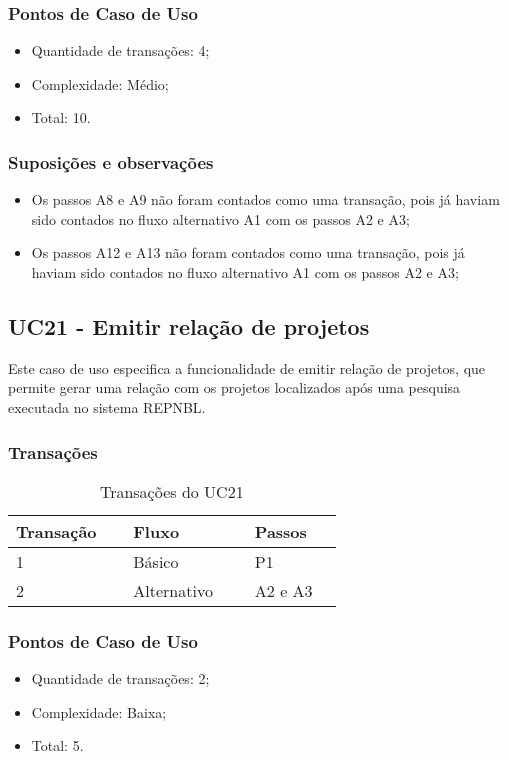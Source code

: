   \subsubsection{Pontos de Caso de Uso}

  \begin{itemize}
  \item Quantidade de transações: 4;
  \item Complexidade: Médio;
  \item Total: 10.
  \end{itemize}
  
  \subsubsection{Suposições e observações}
  
  \begin{itemize}   
   \item Os passos A8 e A9 não foram contados como uma transação, pois já haviam sido contados no fluxo alternativo
      A1 com os passos A2 e A3;
   \item Os passos A12 e A13 não foram contados como uma transação, pois já haviam sido contados no fluxo alternativo
      A1 com os passos A2 e A3;
  \end{itemize}

  \vfill
  
\pagebreak
\subsection{UC21 - Emitir relação de projetos}
  
  Este caso de uso especifica a funcionalidade de emitir relação de projetos, que permite gerar uma relação com
  os projetos localizados após uma pesquisa executada no sistema REPNBL.
  
  \subsubsection{Transações}

  \begin{table*}[!h]
  \centering
  \caption{Transações do UC21}
  \label{uc21_transactions}
    \begin{tabular}{|p{0.20\linewidth}|p{0.25\linewidth}|p{0.20\linewidth}|}
    \hline
    \textbf{Transação} & \textbf{Fluxo} & \textbf{Passos} \\ 
    \hline
    1 & Básico & P1\\
    \hline
    2 & Alternativo & A2 e A3 \\
    \hline
    \end{tabular}
  \end{table*}

  \subsubsection{Pontos de Caso de Uso}

  \begin{itemize}
  \item Quantidade de transações: 2;
  \item Complexidade: Baixa;
  \item Total: 5.
  \end{itemize}

  \vfill